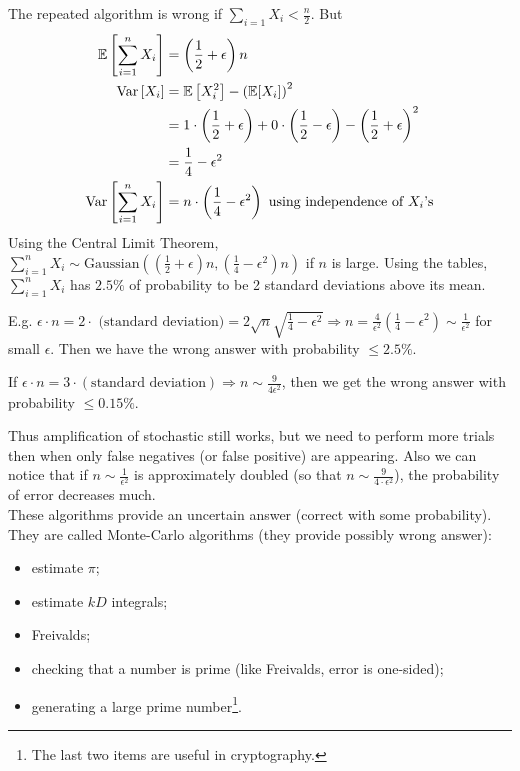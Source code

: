 	The repeated algorithm is wrong if $\sum_{i=1}{X_i}<\frac{n}{2}$. But 
	\begin{align*}
	\mathbb{E}\left[\sum_{i=1}^n{X_i}\right]&=\left(\frac{1}{2}+\epsilon\right)n\\
	\mathrm{Var}\left[X_i\right] &= \mathbb{E}\left[X_i^2\right] - \left(\mathbb{E}[X_i]\right)^2\\
	&=1\cdot \left(\frac{1}{2}+\epsilon\right)+0\cdot \left(\frac{1}{2}-\epsilon\right) - \left(\frac{1}{2}+\epsilon\right)^2\\
	&=\frac{1}{4}-\epsilon^2\\
	\mathrm{Var}\left[\sum_{i=1}^n{X_i}\right]&=n\cdot \left(\frac{1}{4}-\epsilon^2\right)\text{ using independence of }X_i\text{'s}
	\end{align*} 
	Using the Central Limit Theorem, $\sum_{i=1}^n{X_i}\sim \text{Gaussian}\left( \left(\frac{1}{2}+\epsilon\right)n,\left(\frac{1}{4}-\epsilon^2\right)n \right)$ if $n$ is large. Using the tables, $\sum_{i=1}^n{X_i}$ has $2.5\%$ of probability to be 2 standard deviations above its mean.
	
	E.g. $\epsilon \cdot n=2\cdot \text{ (standard deviation)}=2\sqrt{n}\sqrt{\frac{1}{4}-\epsilon^2} \Rightarrow n=\frac{4}{\epsilon^2}\left(\frac{1}{4}-\epsilon^2\right)\sim \frac{1}{\epsilon^2}$ for small $\epsilon$. Then we have the wrong answer with probability $\leq 2.5\%$.
	
	If $\epsilon\cdot n=3\cdot (\text{standard deviation})\Rightarrow n\sim \frac{9}{4\epsilon^2}$, then we get the wrong answer with probability $\leq 0.15\%$.
	
	Thus amplification of stochastic still works, but we need to perform more trials then when only false negatives (or false positive) are appearing. Also we can notice that if $n\sim \frac{1}{\epsilon^2}$ is approximately doubled (so that $n\sim \frac{9}{4\cdot \epsilon^2}$), the probability of error decreases much.\\
	
	These algorithms provide an uncertain answer (correct with some probability). They are called Monte-Carlo algorithms (they provide possibly wrong answer):
	\begin{itemize}
		\item estimate $\pi$;
		\item estimate $kD$ integrals;
		\item Freivalds;
		\item checking that a number is prime (like Freivalds, error is one-sided);
		\item generating a large prime number\footnote{The last two items are useful in cryptography.}.
	\end{itemize}
\vspace{0.5cm}

